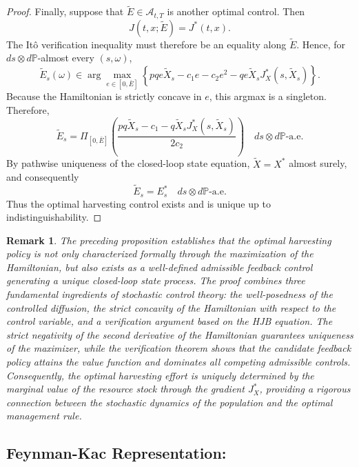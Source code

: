 \documentclass[11pt]{article}
\newtheorem{remark}{\bf Remark}
\begin{document}
\begin{proof}
		Finally, suppose that $\widetilde E\in\mathcal{A}_{t,T}$ is another optimal control. Then
		\[
		J(t,x;\widetilde E)=J^*(t,x).
		\]
		The It\^o verification inequality must therefore be an equality along $\widetilde E$. Hence, for $ds\otimes d\mathbb{P}$-almost every $(s,\omega)$,
		\[
		\widetilde E_s(\omega)
		\in
		\arg\max_{e\in[0,\bar E]}
		\left\{
		pq e\widetilde X_s-c_1e-c_2e^2
		-qe\widetilde X_sJ_X^*(s,\widetilde X_s)
		\right\}.
		\]
		Because the Hamiltonian is strictly concave in $e$, this argmax is a singleton. Therefore,
		\[
		\widetilde E_s
		=
		\Pi_{[0,\bar E]}
		\left(
		\frac{pq\widetilde X_s-c_1-q\widetilde X_sJ_X^*(s,\widetilde X_s)}{2c_2}
		\right)
		\quad
		ds\otimes d\mathbb{P}\text{-a.e.}
		\]
		By pathwise uniqueness of the closed-loop state equation, $\widetilde X=X^*$ almost surely, and consequently
		\[
		\widetilde E_s=E_s^*
		\quad
		ds\otimes d\mathbb{P}\text{-a.e.}
		\]
		Thus the optimal harvesting control exists and is unique up to indistinguishability.
	\end{proof}
	
	\begin{remark}
		The preceding proposition establishes that the optimal harvesting policy is not only characterized formally through the maximization of the Hamiltonian, but also exists as a well-defined admissible feedback control generating a unique closed-loop state process. The proof combines three fundamental ingredients of stochastic control theory: the well-posedness of the controlled diffusion, the strict concavity of the Hamiltonian with respect to the control variable, and a verification argument based on the HJB equation. The strict negativity of the second derivative of the Hamiltonian guarantees uniqueness of the maximizer, while the verification theorem shows that the candidate feedback policy attains the value function and dominates all competing admissible controls. Consequently, the optimal harvesting effort is uniquely determined by the marginal value of the resource stock through the gradient $J_X^*$, providing a rigorous connection between the stochastic dynamics of the population and the optimal management rule.
	\end{remark}
	
	\subsection{Feynman-Kac Representation:}
	
\end{document}
